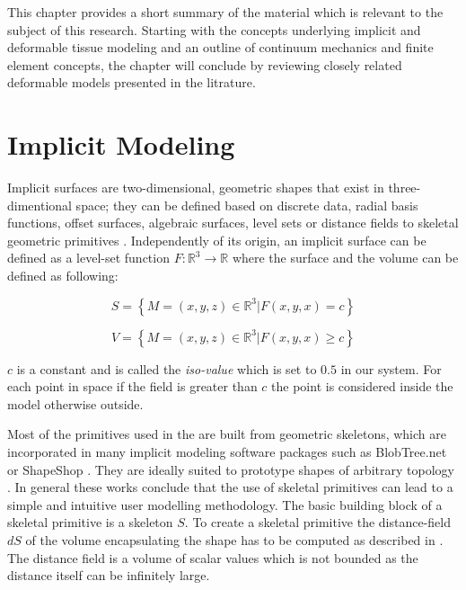 \label{chapter:background}

\newlength{\savedunitlength}
\setlength{\unitlength}{2em}
This chapter provides a short summary of the material which is relevant to the subject of this research. Starting with the concepts underlying 
implicit and deformable tissue modeling and an outline of continuum mechanics and finite element concepts, the chapter will conclude by reviewing closely related 
deformable models presented in the litrature. 

\section{Implicit Modeling}
\label{sec:implicitmodelingintro}
Implicit surfaces are two-dimensional, geometric shapes that exist in three-dimentional space; they can be defined based on discrete data, 
radial basis functions, offset surfaces, algebraic surfaces, level sets or distance fields to skeletal geometric primitives \cite{Bloomenthal1997}.
Independently of its origin, an implicit surface can be defined as a level-set function $F:\mathbb{R}^3 \rightarrow \mathbb{R}$ where the surface 
and the volume can be defined as following:

\begin{equation}
S = \left\{M = (x,y,z) \in \mathbb{R}^3 | F(x,y,x) = c\right\}
\end{equation}

\begin{equation}
V = \left\{M = (x,y,z) \in \mathbb{R}^3 | F(x,y,x) \geq c\right\}
\end{equation}

$c$ is a constant and is called the \textit{iso-value} which is set to $0.5$ in our system. For each point in space if the field is greater than
$c$ the point is considered inside the model otherwise outside. 

Most of the primitives used in the \blob are built from geometric skeletons, which are incorporated in many implicit modeling software packages 
such as BlobTree.net \cite{de2008blobtree} or ShapeShop \cite{Schmidt2006}. They are ideally suited to prototype shapes of arbitrary topology 
\cite{Bloomenthal1997}. In general these works conclude that the use of skeletal primitives can lead to a simple and intuitive user modelling 
methodology. The basic building block of a skeletal primitive is a skeleton $S$. To create a skeletal primitive the distance-field $dS$ of the 
volume encapsulating the shape has to be computed as described in \cite{Barbier2004}. The distance field is a volume of scalar values which is 
not bounded as the distance itself can be infinitely large.

